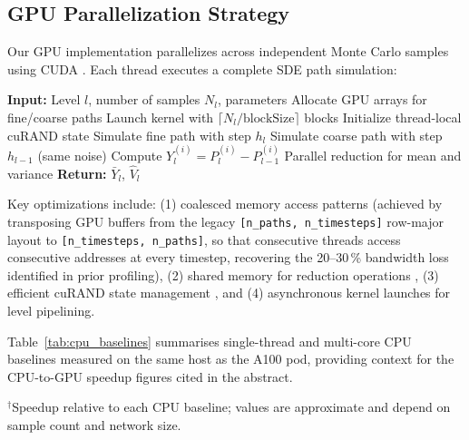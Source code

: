 \documentclass{ieeeaccess}
\begin{document}
\subsection{GPU Parallelization Strategy}

Our GPU implementation parallelizes across independent Monte Carlo samples using CUDA
\cite{nvidia2020cuda}. Each thread executes a complete SDE path simulation:

\begin{algorithm}
\caption{GPU Parallel MLMC Sampling (PyTorch CUDA tensors on A100; PyCUDA
\texttt{SourceModule} variant for compatible drivers)}
\label{alg:gpu}
\begin{algorithmic}[1]
\STATE \textbf{Input:} Level $l$, number of samples $N_l$, parameters
\STATE Allocate GPU arrays for fine/coarse paths
\STATE Launch kernel with $\lceil N_l / \text{blockSize} \rceil$ blocks
    \STATE Initialize thread-local cuRAND state
    \STATE Simulate fine path with step $h_l$
    \STATE Simulate coarse path with step $h_{l-1}$ (same noise)
    \STATE Compute $Y_l^{(i)} = P_l^{(i)} - P_{l-1}^{(i)}$
\ENDFOR
\STATE Parallel reduction for mean and variance \cite{harris2007}
\STATE \textbf{Return:} $\bar{Y}_l$, $\hat{V}_l$
\end{algorithmic}
\end{algorithm}

Key optimizations include: (1) coalesced memory access patterns
   (achieved by transposing GPU buffers from the legacy
   \texttt{[n\_paths, n\_timesteps]} row-major layout to
   \texttt{[n\_timesteps, n\_paths]}, so that consecutive threads access
   consecutive addresses at every timestep, recovering the 20--30\,\%
   bandwidth loss identified in prior profiling), (2) shared memory for
reduction operations \cite{harris2007}, (3) efficient cuRAND state management \cite{nvidia2020cuda},
and (4) asynchronous kernel launches for level pipelining.

Table~\ref{tab:cpu_baselines} summarises single-thread and multi-core CPU baselines measured on
the same host as the A100 pod, providing context for the CPU-to-GPU speedup figures cited in the
abstract.

\begin{table}[!t]
\caption{CPU Baseline Throughput (Intel Xeon, synthetic $n{=}500$,
         $N{=}10{,}000$ samples)}
\label{tab:cpu_baselines}
\centering
{}
\vspace{2pt}
\footnotesize
$^\dagger$Speedup relative to each CPU baseline; values are
approximate and depend on sample count and network size.
\end{table}
\end{document}
